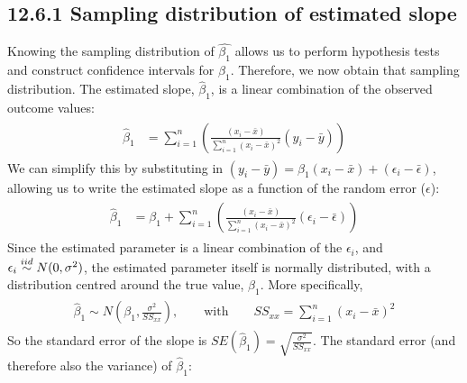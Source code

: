 \documentclass[letterpaper,10pt,english]{jupyterBook}
\begin{document}
\subsection{12.6.1 Sampling distribution of estimated slope}
\label{\detokenize{12.g. Linear Regression I:sampling-distribution-of-estimated-slope}}
\sphinxAtStartPar
Knowing the sampling distribution of \(\hat{\beta_1}\) allows us to perform hypothesis tests and construct confidence intervals for \(\beta_1\). Therefore, we now obtain that sampling distribution. The estimated slope, \(\hat{\beta}_1\), is a linear combination of the observed outcome values:
\begin{equation*}
\begin{split}
\begin{align}
\hat{\beta}_1 &= \sum_{i=1}^n \left(\frac{(x_i-\bar{x})}{\sum_{i=1}^n(x_i-\bar{x})^2}(y_i-\bar{y})\right) 
\end{align}
\end{split}
\end{equation*}
\sphinxAtStartPar
We can simplify this by substituting in \((y_i - \bar{y})=\beta_1(x_i-\bar{x})+(\epsilon_i-\bar{\epsilon})\), allowing us to write the estimated slope as a function of the random error (\(\epsilon\)):
\begin{equation*}
\begin{split}
\begin{align}
\hat{\beta}_1  &=\beta_1 + \sum_{i=1}^n \left(\frac{(x_i-\bar{x})}{\sum_{i=1}^n(x_i-\bar{x})^2}(\epsilon_i-\bar{\epsilon})\right)
\end{align}
\end{split}
\end{equation*}
\sphinxAtStartPar
Since the estimated parameter is a linear combination of the \(\epsilon_i\), and \(\epsilon_i \overset{\small{iid}}{\sim} N(0, \sigma^2)\), the estimated parameter itself is normally distributed, with a distribution centred around the true value, \(\beta_1\). More specifically,
\begin{equation*}
\begin{split}
\begin{align}
\hat{\beta}_1  \sim N\left(\beta_1, \frac{\sigma^2}{SS_{xx}}\right), \qquad \mbox{with} \qquad  SS_{xx} = \sum_{i=1}^n(x_i-\bar{x})^2
\end{align}
\end{split}
\end{equation*}
\sphinxAtStartPar
So the standard error of the slope is \(SE(\hat{\beta}_1) = \sqrt{\frac{\sigma^2}{SS_{xx}}}\). The standard error (and therefore also the variance) of \(\hat{\beta}_1\):
\end{document}
